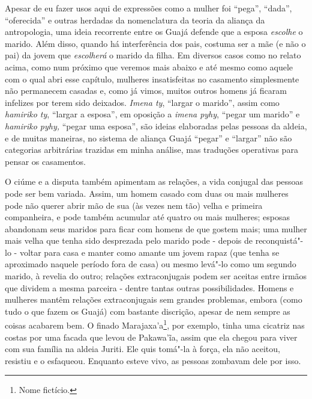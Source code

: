 Apesar de eu fazer usos aqui de expressões como a mulher foi ``pega'',
``dada'', ``oferecida'' e outras herdadas da nomenclatura da teoria da
aliança da antropologia, uma ideia recorrente entre os Guajá defende que
a esposa \emph{escolhe} o marido. Além disso, quando há interferência
dos pais, costuma ser a mãe (e não o pai) da jovem que \emph{escolherá}
o marido da filha. Em diversos casos como no relato acima, como num
próximo que veremos mais abaixo e até mesmo como aquele com o qual abri
esse capítulo, mulheres insatisfeitas no casamento simplesmente não
permanecem casadas e, como já vimos, muitos outros homens já ficaram
infelizes por terem sido deixados. \emph{Imena ty}, ``largar o marido'',
assim como \emph{hamiriko ty}, ``largar a esposa'', em oposição a
\emph{imena pyhy}, ``pegar um marido'' e \emph{hamiriko pyhy,} ``pegar
uma esposa'', são ideias elaboradas pelas pessoas da aldeia, e de muitas
maneiras, no sistema de aliança Guajá ``pegar'' e ``largar'' não são
categorias arbitrárias trazidas em minha análise, mas traduções
operativas para pensar os casamentos.

O ciúme e a disputa também apimentam as relações, a vida conjugal das
pessoas pode ser bem variada. Assim, um homem casado com duas ou mais
mulheres pode não querer abrir mão de sua (às vezes nem tão) velha e
primeira companheira, e pode também acumular até quatro ou mais
mulheres; esposas abandonam seus maridos para ficar com homens de que
gostem mais; uma mulher mais velha que tenha sido desprezada pelo marido
pode - depois de reconquistá"-lo - voltar para casa e manter como amante
um jovem rapaz (que tenha se aproximado naquele período fora de casa) ou
mesmo levá"-lo como um segundo marido, à revelia do outro; relações
extraconjugais podem ser aceitas entre irmãos que dividem a mesma
parceira - dentre tantas outras possibilidades. Homens e mulheres mantêm
relações extraconjugais sem grandes problemas, embora (como tudo o que
fazem os Guajá) com bastante discrição, apesar de nem sempre as coisas
acabarem bem. O finado Marajaxa'a\footnote{Nome fictício.}, por exemplo,
tinha uma cicatriz nas costas por uma facada que levou de Pakawa'ĩa,
assim que ela chegou para viver com sua família na aldeia Juriti. Ele
quis tomá"-la à força, ela não aceitou, resistiu e o esfaqueou. Enquanto
esteve vivo, as pessoas zombavam dele por isso.

